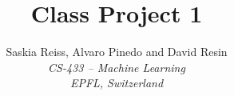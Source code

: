 \documentclass[10pt,conference,compsocconf]{IEEEtran}
\begin{document}
\title{Class Project 1}

\author{%
  Saskia Reiss, Alvaro Pinedo and David Resin\\%
  \textit{CS-433 -- Machine Learning\\EPFL, Switzerland}%
}

\maketitle
\end{document}
